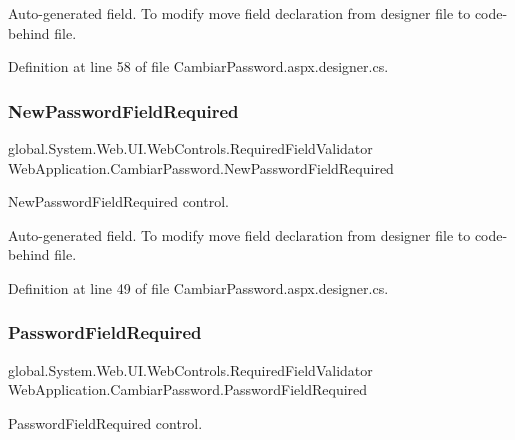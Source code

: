 Auto-\/generated field. To modify move field declaration from designer file to code-\/behind file. 

Definition at line 58 of file Cambiar\+Password.\+aspx.\+designer.\+cs.

\mbox{\label{classWebApplication_1_1CambiarPassword_a3ebddb7e47e8ff7b0221fe69137aeb40}} 
\subsubsection{\texorpdfstring{NewPasswordFieldRequired}{NewPasswordFieldRequired}}
{\footnotesize\ttfamily global.\+System.\+Web.\+U\+I.\+Web\+Controls.\+Required\+Field\+Validator Web\+Application.\+Cambiar\+Password.\+New\+Password\+Field\+Required\hspace{0.3cm}{\ttfamily [protected]}}



New\+Password\+Field\+Required control. 

Auto-\/generated field. To modify move field declaration from designer file to code-\/behind file. 

Definition at line 49 of file Cambiar\+Password.\+aspx.\+designer.\+cs.

\mbox{\label{classWebApplication_1_1CambiarPassword_a2f09ba1ca6615f1c27eab33acf1d660d}} 
\subsubsection{\texorpdfstring{PasswordFieldRequired}{PasswordFieldRequired}}
{\footnotesize\ttfamily global.\+System.\+Web.\+U\+I.\+Web\+Controls.\+Required\+Field\+Validator Web\+Application.\+Cambiar\+Password.\+Password\+Field\+Required\hspace{0.3cm}{\ttfamily [protected]}}



Password\+Field\+Required control. 

